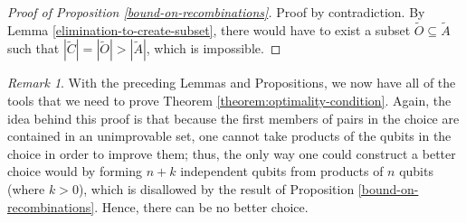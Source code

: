 \documentclass[12pt]{amsbook}
\theoremstyle{plain}
\theoremstyle{definition}
\theoremstyle{remark}
\newtheorem{remark}{Remark}
\newcommand{\set}{\tilde}
\begin{document}
\begin{proof}[Proof of Proposition \ref{bound-on-recombinations}]
Proof by contradiction.  By Lemma \ref{elimination-to-create-subset}, there would have to exist a subset $\set O\subseteq\set A$ such that $|\set C|=|\set O|>|\set A|$, which is impossible.
\end{proof}
\begin{remark}
With the preceding Lemmas and Propositions, we now have all of the tools that we need to prove Theorem \ref{theorem:optimality-condition}.  Again, the idea behind this proof is that because the first members of pairs in the choice are contained in an unimprovable set, one cannot take products of the qubits in the choice in order to improve them;  thus, the only way one could construct a better choice would by forming $n+k$ independent qubits from products of $n$ qubits (where $k>0$), which is disallowed by the result of Proposition \ref{bound-on-recombinations}.  Hence, there can be no better choice.
\end{remark}
\end{document}
